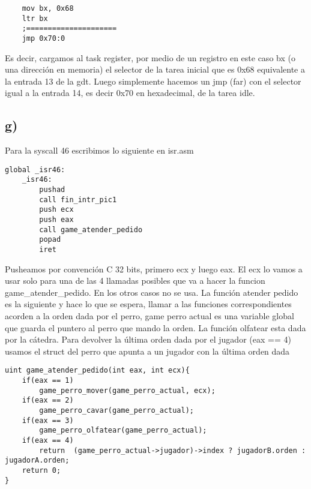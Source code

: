 \begin{codesnippet}
\begin{verbatim}
    mov bx, 0x68            
    ltr bx                  
    ;=====================
    jmp 0x70:0               

\end{verbatim}
\end{codesnippet}

Es decir, cargamos al task register, por medio de un registro en este caso bx (o una dirección en memoria) el selector de la tarea inicial que es 0x68 equivalente a la entrada 13 de la gdt. Luego simplemente hacemos un jmp (far) con el selector igual a la entrada
14, es decir 0x70 en hexadecimal, de la tarea idle. 


\subsection*{g)}
Para la syscall 46 escribimos lo siguiente en isr.asm

\begin{codesnippet}
\begin{verbatim}
global _isr46:
    _isr46:
        pushad
        call fin_intr_pic1
        push ecx
        push eax
        call game_atender_pedido
        popad
        iret 
\end{verbatim}
\end{codesnippet}

Pusheamos por convención C 32 bits, primero ecx y luego eax. El ecx lo vamos a usar solo para una de las 4 llamadas posibles que va a hacer la funcion game\_atender\_pedido. En los otros casos no se usa. La función atender pedido es la siguiente
y hace lo que se espera, llamar a las funciones correspondientes acorden a la orden dada por el perro, game perro actual es una variable global que guarda el puntero al perro que mando la orden. La función olfatear esta dada por la cátedra. Para devolver la última orden dada por el jugador (eax == 4) usamos el struct del perro que apunta a un jugador con la última orden dada

\begin{codesnippet}
\begin{verbatim}
uint game_atender_pedido(int eax, int ecx){
    if(eax == 1)
        game_perro_mover(game_perro_actual, ecx);
    if(eax == 2)
        game_perro_cavar(game_perro_actual);
    if(eax == 3)
        game_perro_olfatear(game_perro_actual);
    if(eax == 4)
        return  (game_perro_actual->jugador)->index ? jugadorB.orden : jugadorA.orden;
    return 0;
}
\end{verbatim}
\end{codesnippet}

